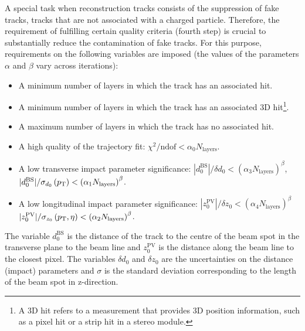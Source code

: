 A special task when reconstruction tracks consists of the suppression of fake tracks, \ie tracks that are not associated with a charged particle.
Therefore, the requirement of fulfilling certain quality criteria (fourth step) is crucial to substantially reduce the contamination of fake tracks.
 For this purpose, requirements on the following variables are imposed (the values of the parameters $\alpha$ and $\beta$ vary across iterations):
\begin{itemize}
\item A minimum number of layers in which the track has an associated hit.
\item A minimum number of layers in which the track has an associated 3D hit\footnote{A 3D hit refers to a measurement that provides 3D position information, such as a pixel hit or a strip hit in a stereo module.}.
\item A maximum number of layers in which the track has no associated hit.
\item A high quality of the trajectory fit: $\chi^2/\text{ndof} < \alpha_0 N_{\text{layers}}$.
\item A low transverse impact parameter significance:  $|d_0^{\text{BS}}|/\delta d_0 < \left( \alpha_3 N_{\text{layers}} \right)^{\beta}$,\\
\hspace*{231pt}                                        $|d_0^{\text{BS}}|/\sigma_{d_0} \left(p_{\text{T}}\right) < \left( \alpha_1 N_{\text{layers}} \right)^{\beta}$.
\item A low longitudinal impact parameter significance: $|z_0^{\text{PV}}|/\delta z_0 < \left( \alpha_4 N_{\text{layers}} \right)^{\beta}$\\
\hspace*{240pt}                                         $|z_0^{\text{PV}}|/\sigma_{z_0} \left(p_{\text{T}},\eta\right) < \left( \alpha_2 N_{\text{layers}} \right)^{\beta}$.
\end{itemize}
The variable $d_0^{\text{BS}}$ is the distance of the track to the centre of the beam spot in the transverse plane to the beam line and $z_0^{\text{PV}}$ is the distance along the beam line to the closest pixel.
The variables $\delta d_0$ and $\delta z_0$ are the uncertainties on the distance (impact) parameters and $\sigma$ is the standard deviation corresponding to the length of the beam spot in z-direction.



